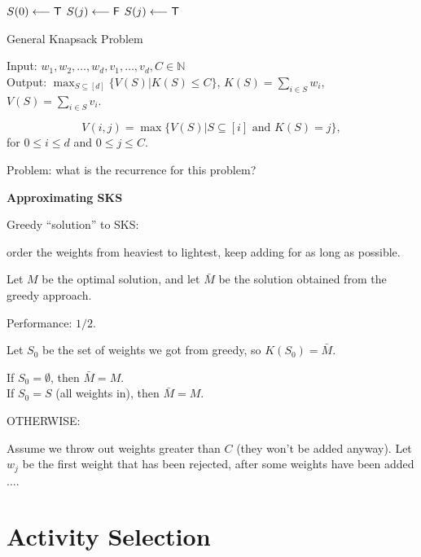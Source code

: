 \begin{frame}
\begin{algorithmic}[1]
\STATE $S(0) \longleftarrow \mathsf{T}$
     \STATE $S(j)\longleftarrow \mathsf{F}$
\ENDFOR
{}
                   \STATE $S(j) \longleftarrow \mathsf{T}$
          \ENDIF
     \ENDFOR
\ENDFOR
\end{algorithmic}
\end{frame}

\begin{frame}
{General Knapsack Problem}

Input: $w_1,w_2,\ldots,w_d,v_1,\ldots,v_d,C\in\mathbb{N}$ \\
Output: $\max_{S\subseteq[d]}\{V(S)|K(S)\leq C\}$,
$K(S)=\sum_{i\in S}w_i$, $V(S)=\sum_{i\in S}v_i$.

$$
V(i,j)=\max\{V(S)|S\subseteq[i]\text{ and }K(S)=j\},
$$
for $0\leq i\leq d$ and $0\leq j\leq C$.

Problem: what is the recurrence for this problem?
\end{frame}

\begin{frame}
{\bf Approximating SKS}

Greedy ``solution'' to SKS:

order the weights from heaviest to lightest, keep adding for as long as
possible.

Let $M$ be the optimal solution, and let $\bar{M}$ be the solution obtained
from the greedy approach.

Performance: $1/2$.
\end{frame}

\begin{frame}
Let $S_0$ be the set of weights we got from greedy, so $K(S_0)=\bar{M}$.

If $S_0=\emptyset$, then $\bar{M}=M$. \\
If $S_0=S$ (all weights in), then $\bar{M}=M$.

OTHERWISE:

Assume we throw out weights greater than $C$ (they won't be added anyway).
Let $w_j$ be the first weight that has been rejected, after some weights have
been added $\ldots$.
\end{frame}

\section{Activity Selection}

